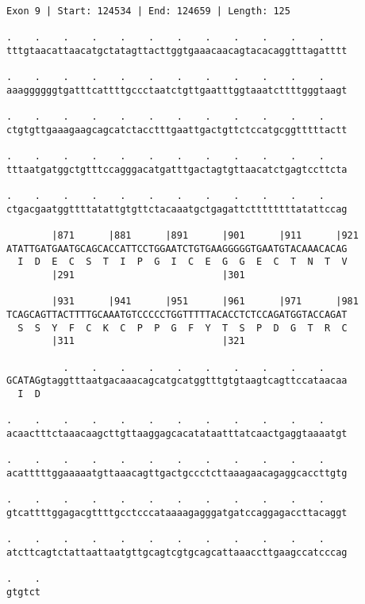 \documentclass{article}
\begin{document}
\begin{Verbatim}
Exon 9 | Start: 124534 | End: 124659 | Length: 125
 
.    .    .    .    .    .    .    .    .    .    .    .    
tttgtaacattaacatgctatagttacttggtgaaacaacagtacacaggtttagatttt
  
.    .    .    .    .    .    .    .    .    .    .    .    
aaaggggggtgatttcattttgccctaatctgttgaatttggtaaatcttttgggtaagt
  
.    .    .    .    .    .    .    .    .    .    .    .    
ctgtgttgaaagaagcagcatctacctttgaattgactgttctccatgcggtttttactt
  
.    .    .    .    .    .    .    .    .    .    .    .    
tttaatgatggctgtttccagggacatgatttgactagtgttaacatctgagtccttcta
  
.    .    .    .    .    .    .    .    .    .    .    .    
ctgacgaatggttttatattgtgttctacaaatgctgagattcttttttttatattccag
  
        |871      |881      |891      |901      |911      |921
ATATTGATGAATGCAGCACCATTCCTGGAATCTGTGAAGGGGGTGAATGTACAAACACAG
  I  D  E  C  S  T  I  P  G  I  C  E  G  G  E  C  T  N  T  V
        |291                          |301                  
  
        |931      |941      |951      |961      |971      |981
TCAGCAGTTACTTTTGCAAATGTCCCCCTGGTTTTTACACCTCTCCAGATGGTACCAGAT
  S  S  Y  F  C  K  C  P  P  G  F  Y  T  S  P  D  G  T  R  C
        |311                          |321                  
  
          .    .    .    .    .    .    .    .    .    .    
GCATAGgtaggtttaatgacaaacagcatgcatggtttgtgtaagtcagttccataacaa
  I  D                                                      
  
.    .    .    .    .    .    .    .    .    .    .    .    
acaactttctaaacaagcttgttaaggagcacatataatttatcaactgaggtaaaatgt
  
.    .    .    .    .    .    .    .    .    .    .    .    
acatttttggaaaaatgttaaacagttgactgccctcttaaagaacagaggcaccttgtg
  
.    .    .    .    .    .    .    .    .    .    .    .    
gtcattttggagacgttttgcctcccataaaagagggatgatccaggagaccttacaggt
  
.    .    .    .    .    .    .    .    .    .    .    .    
atcttcagtctattaattaatgttgcagtcgtgcagcattaaaccttgaagccatcccag
  
.    .
gtgtct
\end{Verbatim}
\newpage
\end{document}

